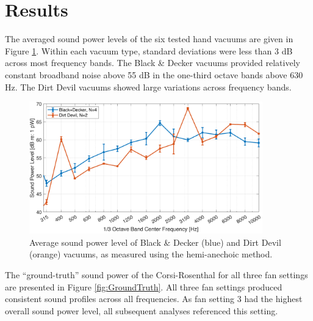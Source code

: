\documentclass[letterpaper,12pt]{article}
\begin{document}
\pagebreak
\section{Results}
The averaged sound power levels of the six tested hand vacuums are given in Figure \ref{fig:HemiVac}. Within each vacuum type, standard deviations were less than 3 dB across most frequency bands. The Black \& Decker vacuums provided relatively constant broadband noise above 55 dB in the one-third octave bands above 630 Hz. The Dirt Devil vacuums showed large variations across frequency bands.
\begin{figure}[h!]
    \centering
    \includegraphics[width=0.9\textwidth]{manuscript/fig/HemiVac.pdf}
    \caption{Average sound power level of Black \& Decker (blue) and Dirt Devil (orange) vacuums, as measured using the hemi-anechoic method.}
    \label{fig:HemiVac}
\end{figure}
The ``ground-truth'' sound power of the Corsi-Rosenthal for all three fan settings are presented in Figure \ref{fig:GroundTruth}. All three fan settings produced consistent sound profiles across all frequencies. As fan setting 3 had the highest overall sound power level, all subsequent analyses referenced this setting.
\end{document}
